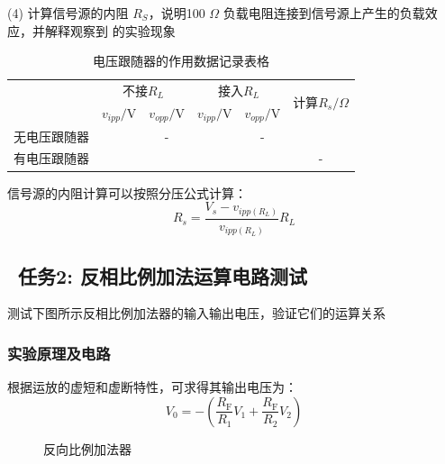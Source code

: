 \documentclass[a4paper,11pt,UTF8]{article}
\begin{document}
(4) 计算信号源的内阻 $R_S$，说明100 $\Omega$ 负载电阻连接到信号源上产生的负载效应，并解释观察到
的实验现象

\begin{table}[h]
	\centering
	\caption{电压跟随器的作用数据记录表格}
	\label{table1}
	\begin{tabular}{|c|c|c|c|c|c|}
		\hline
		\multirow{2}{*}{}   & \multicolumn{2}{c|}{不接$R_L$} & \multicolumn{2}{c|}{接入$R_L$} &
		\multirow{2}{*}{计算$R_s/\Omega$}\\
		\cline{2-5}
		\multirow{2}{*}{} & $v_{ipp}/$V & $v_{opp}/$V & $v_{ipp}/$V & $v_{opp}/$V & \multirow{2}{*}{}\\
		\hline
		无电压跟随器 &  & - &  & - &  \\
		\hline
		有电压跟随器 &  &  &  &  & - \\
		\hline
	\end{tabular}
\end{table}

信号源的内阻计算可以按照分压公式计算：
$$
	R_s=\frac{V_s-v_{ipp(R_L)}}{v_{ipp(R_L)}}R_L
$$

\subsection{ \ 任务2: 反相比例加法运算电路测试}
测试下图所示反相比例加法器的输入输出电压，验证它们的运算关系

\subsubsection{实验原理及电路}
根据运放的虚短和虚断特性，可求得其输出电压为：
$$
	V_0=-\left(\frac{R_{\mathrm{F}}}{R_1}V_1+\frac{R_{\mathrm{F}}}{R_2}V_2\right)
$$

\begin{figure}[H]
	\centering
	\caption{反向比例加法器}
\end{figure}
\end{document}
